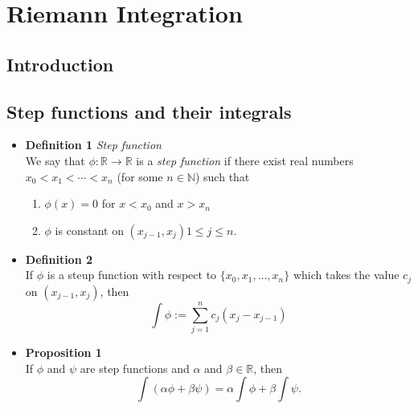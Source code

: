 \documentclass[11pt,a4paper]{article}
\begin{document}


\section{Riemann Integration}

\subsection{Introduction}

\subsection{Step functions and their integrals}

\begin{itemize}
    \item \textbf{Definition 1} \emph{Step function} \\
        We say that $\phi : \mathbb{R} \to \mathbb{R}$ is a \emph{step function} if there
        exist real numbers $x_0 < x_1 < \cdots < x_n$ (for some $n \in \mathbb{N}$) such that
        \begin{enumerate}
            \item $\phi(x) = 0$ for $x < x_0$ and $x > x_n$
            \item $\phi$ is constant on $(x_{j-1}, x_j) 1 \leq j \leq n$.
        \end{enumerate}

    \item \textbf{Definition 2} \\
        If $\phi$ is a steup function with respect to $\{x_0, x_1, \ldots, x_n\}$
        which takes the value $c_j$ on $(x_{j-1}, x_j)$, then
        \[
            \int \phi := \sum_{j=1}^n c_j (x_j - x_{j-1})
        \]

    \item \textbf{Proposition 1} \\
        If $\phi$ and $\psi$ are step functions and $\alpha$ and $\beta \in \mathbb{R}$, then
        \[
            \int(\alpha \phi + \beta \psi) = \alpha \int \phi + \beta \int \psi.
        \]

\end{itemize}
\end{document}
